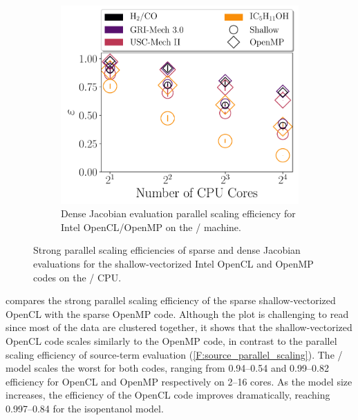 \documentclass[12pt,number,sort&compress,preprint]{elsarticle}
\begin{document}
\begin{figure}[htbp]
\begin{subfigure}[t]{0.48\linewidth}
      \includegraphics[width=\textwidth]{dense_jac_scaling.pdf}
      \caption{Dense Jacobian evaluation parallel scaling efficiency for Intel OpenCL\slash OpenMP on the \avx/ machine.}
      \label{F:dense_jac_scaling}
  \end{subfigure}
  \caption{Strong parallel scaling efficiencies of sparse and dense Jacobian evaluations for the shallow-vectorized Intel OpenCL and OpenMP codes on the \avx/ CPU.}
\end{figure}

 compares the strong parallel scaling efficiency of the sparse shallow-vectorized OpenCL with the sparse OpenMP code.
Although the plot is challenging to read since most of the data are clustered together, it shows that the shallow-vectorized OpenCL code scales similarly to the OpenMP code, in contrast to the parallel scaling efficiency of source-term evaluation (\cref{F:source_parallel_scaling}).
The \slash{} model scales the worst for both codes, ranging from \numrange{0.94}{0.54} and \numrange{0.99}{0.82} efficiency for OpenCL and OpenMP respectively on \numrange{2}{16} cores.
As the model size increases, the efficiency of the OpenCL code improves dramatically, reaching \numrange{0.997}{0.84} for the isopentanol model.
\end{document}
